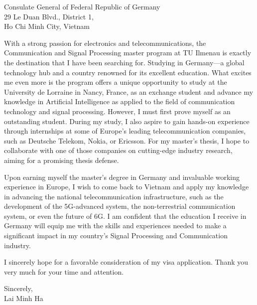 \documentclass[a4paper,11pt]{letter}
\begin{document}
\begin{letter}{
    Consulate General of Federal Republic of Germany
    \\ 29 Le Duan Blvd., District 1,
    \\ Ho Chi Minh City, Vietnam
}

With a strong passion for electronics and telecommunications, the Communication and Signal Processing master program at TU Ilmenau is exactly the destination that I have been searching for. Studying in Germany—a global technology hub and a country renowned for its excellent education. What excites me even more is the program offers a unique opportunity to study at the University de Lorraine in Nancy, France, as an exchange student and advance my knowledge in Artificial Intelligence as applied to the field of communication technology and signal processing. However, I must first prove myself as an outstanding student. During my study, I also aspire to gain hands-on experience through internships at some of Europe's leading telecommunication companies, such as Deutsche Telekom, Nokia, or Ericsson. For my master's thesis, I hope to collaborate with one of those companies on cutting-edge industry research, aiming for a promising thesis defense.

Upon earning myself the master's degree in Germany and invaluable working experience in Europe, I wish to come back to Vietnam and apply my knowledge in advancing the national telecommunication infrastructure, such as the development of the 5G-advanced system, the non-terrestrial communication system, or even the future of 6G. I am confident that the education I receive in Germany will equip me with the skills and experiences needed to make a significant impact in my country's Signal Processing and Communication industry.

I sincerely hope for a favorable consideration of my visa application. Thank you very much for your time and attention.

\begin{flushright}
    Sincerely,
    \\ Lai Minh Ha
\end{flushright}

\end{letter}
\end{document}
